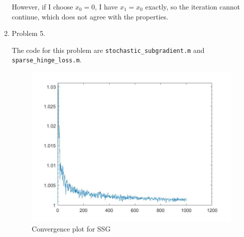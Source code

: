 \documentclass{article}
\begin{document}
\begin{enumerate}
However, if I choose $x_0  = 0$, I have $x_1 = x_0 $ exactly, so the iteration cannot continue, which does not agree with the properties. 

\item Problem 5.

The code for this problem are \texttt{stochastic\_subgradient.m} and \texttt{sparse\_hinge\_loss.m}.
\begin{figure}
\centering
\includegraphics[scale=0.4]{problem5.jpg}
\caption{Convergence plot for SSG}
\label{problem 5}
\end{figure}


\end{enumerate}
\end{document}
